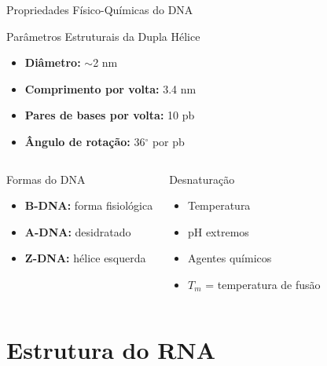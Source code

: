 \begin{frame}[allowframebreaks]{Propriedades Físico-Químicas do DNA}
\begin{block}{Parâmetros Estruturais da Dupla Hélice}
\begin{itemize}
    \item \textbf{Diâmetro:} $\sim$2 nm
    \item \textbf{Comprimento por volta:} 3.4 nm
    \item \textbf{Pares de bases por volta:} 10 pb
    \item \textbf{Ângulo de rotação:} 36$^{\circ}$ por pb
\end{itemize}
\end{block}

\vspace{0.3cm}

\begin{columns}
\begin{exampleblock}{Formas do DNA}
\begin{itemize}
    \item \textbf{B-DNA:} forma fisiológica
    \item \textbf{A-DNA:} desidratado
    \item \textbf{Z-DNA:} hélice esquerda
\end{itemize}
\end{exampleblock}

\begin{alertblock}{Desnaturação}
\begin{itemize}
    \item Temperatura
    \item pH extremos
    \item Agentes químicos
    \item $T_m$ = temperatura de fusão
\end{itemize}
\end{alertblock}
\end{columns}
\end{frame}

\section{Estrutura do RNA}

